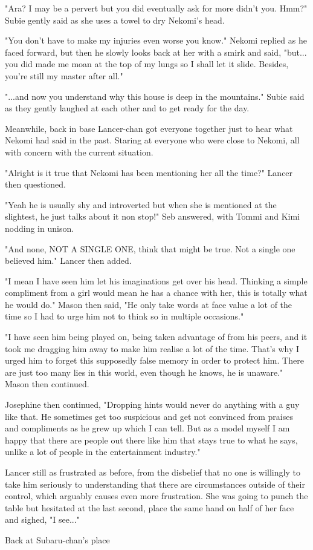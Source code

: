 "Ara? I may be a pervert but you did eventually ask for more didn't you. Hmm?" Subie gently said as she uses a towel to dry Nekomi's head. 

"You don't have to make my injuries even worse you know." Nekomi replied as he faced forward, but then he slowly looks back at her with a smirk and said, "but... you did made me moan at the top of my lungs so I shall let it slide. Besides, you're still my master after all."

"...and now you understand why this house is deep in the mountains." Subie said as they gently laughed at each other and to get ready for the day.

\hfill

Meanwhile, back in base Lancer-chan got everyone together just to hear what Nekomi had said in the past. 
Staring at everyone who were close to Nekomi, all with concern with the current situation. 

"Alright is it true that Nekomi has been mentioning her all the time?" Lancer then questioned. 

"Yeah he is usually shy and introverted but when she is mentioned at the slightest, he just talks about it non stop!" Seb answered, with Tommi and Kimi nodding in unison. 

"And none, NOT A SINGLE ONE, think that might be true. Not a single one believed him." Lancer then added. 

"I mean I have seen him let his imaginations get over his head. Thinking a simple compliment from a girl would mean he has a chance with her, this is totally what he would do." Mason then said, "He only take words at face value a lot of the time so I had to urge him not to think so in multiple occasions." 

"I have seen him being played on, being taken advantage of from his peers, and it took me dragging him away to make him realise a lot of the time. That's why I urged him to forget this supposedly false memory in order to protect him. There are just too many lies in this world, even though he knows, he is unaware." Mason then continued. 

Josephine then continued, "Dropping hints would never do anything with a guy like that. He sometimes get too suspicious and get not convinced from praises and compliments as he grew up which I can tell. But as a model myself I am happy that there are people out there like him that stays true to what he says, unlike a lot of people in the entertainment industry."

Lancer still as frustrated as before, from the disbelief that no one is willingly to take him seriously to understanding that there are circumstances outside of their control, which arguably causes even more frustration. 
She was going to punch the table but hesitated at the last second, place the same hand on half of her face and sighed,
"I see..." 

\hfill

Back at Subaru-chan's place
